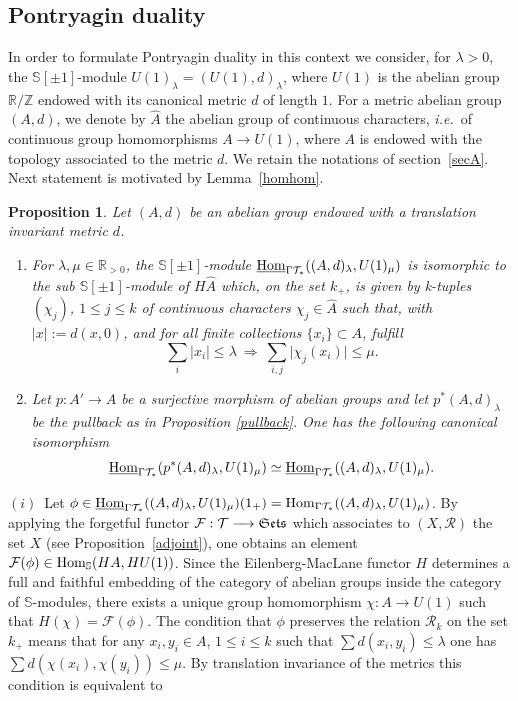 \documentclass[cupthm]{CUP-JNL-JMJ}
\numberwithin{equation}{section}
\theoremstyle{cupplain}
\newtheorem{proposition}[theorem]{Proposition}
\theoremstyle{cupdefinition}
\theoremstyle{cupremark}
\theoremstyle{cupproof}
\def\R{{\mathbb R}}
\def\S{{\mathbb S}}
\def\Z{{\mathbb Z}}
\def\cF{{\mathcal F}}
\def\cR{{\mathcal R}}
\def\cT{{\mathcal T}}
\def\sss{{\S}}
\def\spm{{\sss[\pm 1]}}
\def\Se{\frak{ Sets}}
\def\Hom {{\rm{Hom}}}
\def\uhom{{\underline \Hom}}
\newcommand{\ie}{{\it i.e.\/}\ }
\begin{document}
\subsection{Pontryagin duality}\label{sectpontdual}


In order to formulate Pontryagin duality in this context we consider, for $\lambda>0$,  the $\spm$-module  $U(1)_\lambda=(U(1),d)_\lambda$, where $U(1)$ is the abelian group $\R/\Z$ endowed with its canonical metric $d$ of length $1$. For a metric abelian group $(A,d)$, we denote by $\widehat A$  the abelian group of continuous characters, \ie of  continuous group homomorphisms $A\to U(1)$, where $A$ is endowed with the topology associated to the metric $d$. 
We retain the notations of section~\ref{secA}. Next statement is motivated by  Lemma~\ref{homhom}.


\begin{proposition}\label{pontrj} Let $(A,d)$ be an abelian group endowed with a translation invariant metric $d$. 
\begin{enumerate}
\item[(i)] For $\lambda, \mu\in\R_{>0}$, the $\spm$-module $\uhom_{\Gamma\cT_*}((A,d)_\lambda,U(1)_\mu)$ is isomorphic to the sub $\spm$-module of $H\widehat A$ which, on the set $k_+$, is given by k-tuples $(\chi_j)$, $1\leq j\leq k$ of continuous characters  
	$\chi_j\in \widehat A$ such that, with $\vert x\vert:=d(x,0)$, and for all finite collections $\{x_i\}\subset A$, fulfill
	\begin{equation}\label{inequ1}
	\sum_i \vert x_{i}\vert \leq \lambda~ \Rightarrow ~\sum_{i,j} \vert \chi_j(x_{i})\vert \leq \mu.
	\end{equation}
	\item[(ii)] Let $p:A'\to A$ be a surjective morphism of abelian groups and let $p^*(A,d)_\lambda$ be the pullback as in Proposition \ref{pullback}. One has the following canonical isomorphism 
	\begin{equation}\label{isoduals}
	\uhom_{\Gamma\cT_*}(p^*(A,d)_\lambda,U(1)_\mu)\simeq \uhom_{\Gamma\cT_*}((A,d)_\lambda,U(1)_\mu).
	\end{equation}
	\end{enumerate}
	\end{proposition}
	\proof $(i)$~Let $\phi\in\uhom_{\Gamma\cT_*}((A,d)_\lambda,U(1)_\mu)(1_+)=\Hom_{\Gamma\cT_*}((A,d)_\lambda,U(1)_\mu)$. By applying the forgetful functor $\cF:\cT\longrightarrow \Se$ which associates to $(X,\cR)$ the set $X$ (see Proposition~\ref{adjoint}), one obtains  an element $\cF(\phi)\in \Hom_\sss(HA,HU(1))$. Since the Eilenberg-MacLane functor   $H$ determines a full and faithful embedding of the category of abelian groups inside the category of $\sss$-modules,  there exists a unique  group homomorphism $\chi:A\to U(1)$  such that $H(\chi)=\cF(\phi)$. The condition that $\phi$ preserves the relation $\cR_k$  on the set $k_+$ means that for any $x_i,y_i\in A$, $1\leq i\leq k$ such that $\sum d(x_i,y_i)\leq \lambda$ one has $\sum d(\chi(x_i),\chi(y_i))\leq \mu$. By translation invariance of the metrics this condition is equivalent to 
\end{document}
